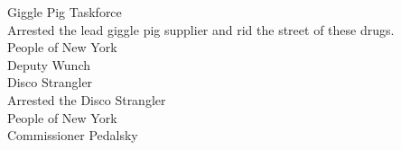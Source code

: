 %
 Giggle Pig Taskforce \\
 Arrested the lead giggle pig supplier and rid the street of these drugs. \\
 People of New York\\
 Deputy Wunch\\
\tcbline
{} Disco Strangler\\
 Arrested the Disco Strangler\\
 People of New York\\
 Commissioner Pedalsky\\
